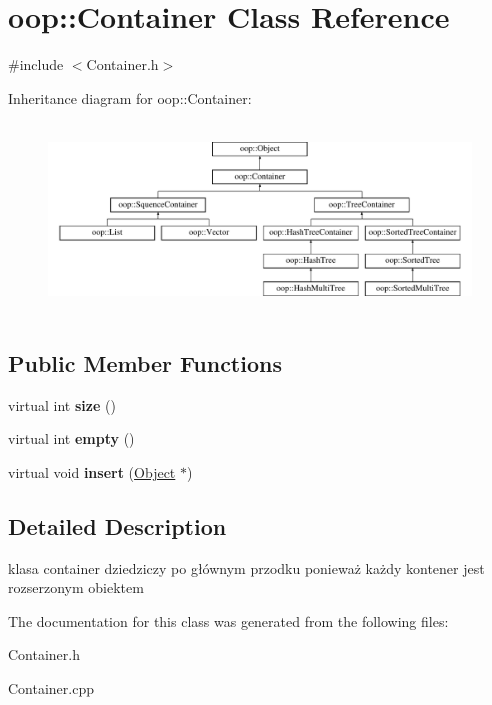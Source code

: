 \hypertarget{classoop_1_1Container}{\section{oop\-:\-:\-Container \-Class \-Reference}
\label{classoop_1_1Container}
}


{\ttfamily \#include $<$\-Container.\-h$>$}

\-Inheritance diagram for oop\-:\-:\-Container\-:\begin{figure}[H]
\begin{center}
\leavevmode
\includegraphics[height=5.090909cm]{classoop_1_1Container}
\end{center}
\end{figure}
\subsection*{\-Public \-Member \-Functions}
\begin{DoxyCompactItemize}
\item 
\hypertarget{classoop_1_1Container_ad801eba9a4943417407b6a21061517e5}{virtual int {\bfseries size} ()}\label{classoop_1_1Container_ad801eba9a4943417407b6a21061517e5}

\item 
\hypertarget{classoop_1_1Container_a8bf226d4b09f15b8c13b23de7c9cb64b}{virtual int {\bfseries empty} ()}\label{classoop_1_1Container_a8bf226d4b09f15b8c13b23de7c9cb64b}

\item 
\hypertarget{classoop_1_1Container_a4786051f94579ede522a4c81b82d6b95}{virtual void {\bfseries insert} (\hyperlink{classoop_1_1Object}{\-Object} $\ast$)}\label{classoop_1_1Container_a4786051f94579ede522a4c81b82d6b95}

\end{DoxyCompactItemize}


\subsection{\-Detailed \-Description}
klasa container dziedziczy po głównym przodku ponieważ każdy kontener jest rozserzonym obiektem 

\-The documentation for this class was generated from the following files\-:\begin{DoxyCompactItemize}
\item 
\-Container.\-h\item 
\-Container.\-cpp\end{DoxyCompactItemize}
